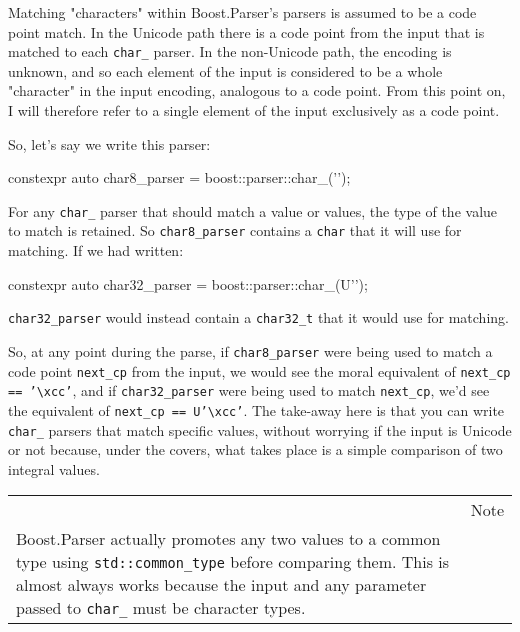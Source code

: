 Matching "characters" within Boost.Parser's parsers is assumed to be a code point match. In the Unicode path there is a code point from the input that is matched to each \texttt{char\_} parser. In the non-Unicode path, the encoding is unknown, and so each element of the input is considered to be a whole "character" in the input encoding, analogous to a code point. From this point on, I will therefore refer to a single element of the input exclusively as a code point.

So, let's say we write this parser:

\begin{code}
constexpr auto char8_parser = boost::parser::char_('\xcc');
\end{code}

For any \texttt{char\_} parser that should match a value or values, the type of the value to match is retained. So \texttt{char8\_parser} contains a \texttt{char} that it will use for matching. If we had written:

\begin{code}
constexpr auto char32_parser = boost::parser::char_(U'\xcc');
\end{code}

\texttt{char32\_parser} would instead contain a \texttt{char32\_t} that it would use for matching.

So, at any point during the parse, if \texttt{char8\_parser} were being used to match a code point \texttt{next\_cp} from the input, we would see the moral equivalent of \texttt{next\_cp == '\textbackslash{}xcc'}, and if \texttt{char32\_parser} were being used to match \texttt{next\_cp}, we'd see the equivalent of \texttt{next\_cp == U'\textbackslash{}xcc'}. The take-away here is that you can write \texttt{char\_} parsers that match specific values, without worrying if the input is Unicode or not because, under the covers, what takes place is a simple comparison of two integral values.

\begin{longtable}[]{@{}
  >{\raggedright\arraybackslash}p{}
  >{\raggedright\arraybackslash}p{}@{}}
\toprule\noalign{}
\endhead
\bottomrule\noalign{}
\endlastfoot
\begin{minipage}[t]{\linewidth}\raggedright
\end{minipage} & Note \\
Boost.Parser actually promotes any two values to a common type using \texttt{std::common\_type} before comparing them. This is almost always works because the input and any parameter passed to \texttt{char\_} must be character types. & \\
\end{longtable}

